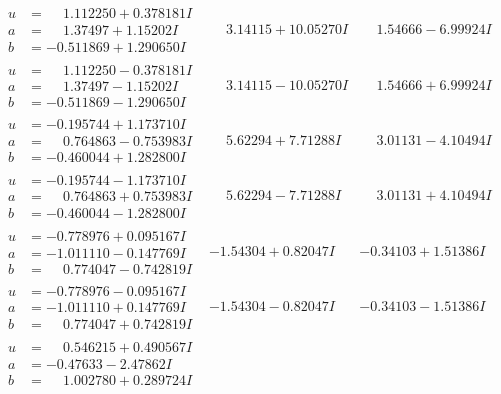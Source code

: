 \documentclass[1p]{elsarticle_modified}
\theoremstyle{definition}
\begin{document}
$$\begin{array}{c|c|c}
\begin{aligned}
u &= \phantom{-}1.112250 + 0.378181 I \\
a &= \phantom{-}1.37497 + 1.15202 I \\
b &= -0.511869 + 1.290650 I\end{aligned}
 & \phantom{-}3.14115 + 10.05270 I & \phantom{-}1.54666 - 6.99924 I \\ \hline\begin{aligned}
u &= \phantom{-}1.112250 - 0.378181 I \\
a &= \phantom{-}1.37497 - 1.15202 I \\
b &= -0.511869 - 1.290650 I\end{aligned}
 & \phantom{-}3.14115 - 10.05270 I & \phantom{-}1.54666 + 6.99924 I \\ \hline\begin{aligned}
u &= -0.195744 + 1.173710 I \\
a &= \phantom{-}0.764863 - 0.753983 I \\
b &= -0.460044 + 1.282800 I\end{aligned}
 & \phantom{-}5.62294 + 7.71288 I & \phantom{-}3.01131 - 4.10494 I \\ \hline\begin{aligned}
u &= -0.195744 - 1.173710 I \\
a &= \phantom{-}0.764863 + 0.753983 I \\
b &= -0.460044 - 1.282800 I\end{aligned}
 & \phantom{-}5.62294 - 7.71288 I & \phantom{-}3.01131 + 4.10494 I \\ \hline\begin{aligned}
u &= -0.778976 + 0.095167 I \\
a &= -1.011110 - 0.147769 I \\
b &= \phantom{-}0.774047 - 0.742819 I\end{aligned}
 & -1.54304 + 0.82047 I & -0.34103 + 1.51386 I \\ \hline\begin{aligned}
u &= -0.778976 - 0.095167 I \\
a &= -1.011110 + 0.147769 I \\
b &= \phantom{-}0.774047 + 0.742819 I\end{aligned}
 & -1.54304 - 0.82047 I & -0.34103 - 1.51386 I \\ \hline\begin{aligned}
u &= \phantom{-}0.546215 + 0.490567 I \\
a &= -0.47633 - 2.47862 I \\
b &= \phantom{-}1.002780 + 0.289724 I\end{aligned}

\end{array}$$
\end{document}
